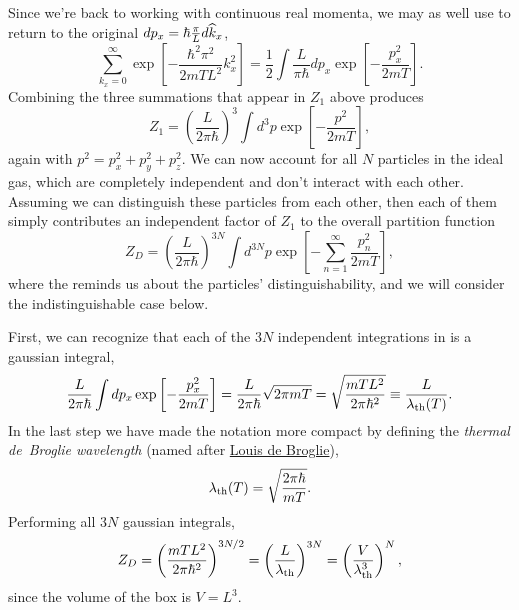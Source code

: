 Since we're back to working with continuous real momenta, we may as well use  to return to the original $dp_x = \hbar \frac{\pi}{L} d\widehat k_x$,
\begin{equation*}
  \sum_{k_x = 0}^{\infty} \exp\left[-\frac{\hbar^2 \pi^2}{2mTL^2} k_x^2\right] = \frac{1}{2} \int \frac{L}{\pi\hbar} dp_x \exp\left[-\frac{p_x^2}{2mT}\right].
\end{equation*}
Combining the three summations that appear in $Z_1$ above produces
\begin{equation*}
  Z_1 = \left(\frac{L}{2\pi\hbar}\right)^3 \int d^3p \exp\left[-\frac{p^2}{2mT}\right],
\end{equation*}
again with $p^2 = p_x^2 + p_y^2 + p_z^2$.
We can now account for all $N$ particles in the ideal gas, which are completely independent and don't interact with each other.
Assuming we can distinguish these particles from each other, then each of them simply contributes an independent factor of $Z_1$ to the overall partition function
\begin{equation}
  \label{eq:ideal_dist_int}
  Z_D = \left(\frac{L}{2\pi\hbar}\right)^{3N} \int d^{3N}p \exp\left[-\sum_{n = 1}^{\infty} \frac{p_n^2}{2mT}\right],
\end{equation}
where the reminds us about the particles' distinguishability, and we will consider the indistinguishable case below.

First, we can recognize that each of the $3N$ independent integrations in  is a gaussian integral,
\begin{equation*}
  \frac{L}{2\pi\hbar} \int dp_x \exp\left[-\frac{p_x^2}{2mT}\right] = \frac{L}{2\pi\hbar} \sqrt{2\pi mT} = \sqrt{\frac{mTL^2}{2\pi\hbar^2}} \equiv \frac{L}{\lambda_{\mathrm{th}}(T)}.
\end{equation*}
In the last step we have made the notation more compact by defining the \textit{thermal de~Broglie wavelength} (named after \href{https://en.wikipedia.org/wiki/Louis_de_Broglie}{Louis de Broglie}),
\begin{equation}
  \lambda_{\mathrm{th}}(T) = \sqrt{\frac{2\pi\hbar}{mT}}.
\end{equation}
Performing all $3N$ gaussian integrals,
\begin{equation}
  \label{eq:ideal_dist}
  Z_D = \left(\frac{mTL^2}{2\pi\hbar^2}\right)^{3N / 2} = \left(\frac{L}{\lambda_{\mathrm{th}}}\right)^{3N} = \left(\frac{V}{\lambda_{\mathrm{th}}^3}\right)^N,
\end{equation}
since the volume of the box is $V = L^3$.

